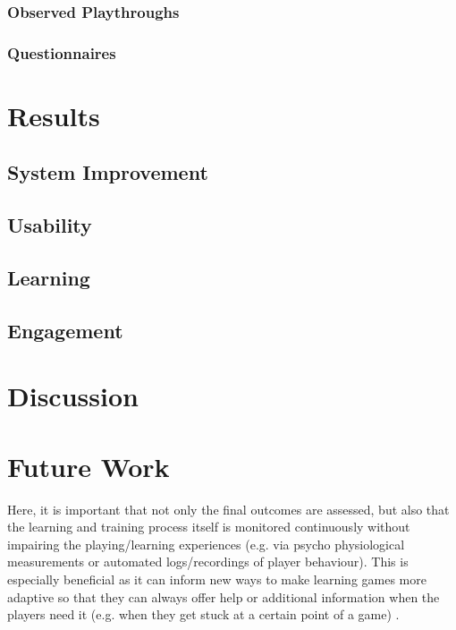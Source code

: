 \documentclass[a4paper,11.5pt]{report}
\numberwithin{figure}{section}
\numberwithin{table}{section}
\numberwithin{equation}{section}
\numberwithin{equation}{section}
\newcommand\blankpage{%
    \null
    \thispagestyle{empty}%
    \addtocounter{page}{-1}%
    \newpage}
\begin{document}
\subsection{Observed Playthroughs} %
\subsection{Questionnaires}



\afterpage{\blankpage}




\chapter{Results}

\section{System Improvement}

\section{Usability}

\section{Learning}

\section{Engagement}

\afterpage{\blankpage}




\chapter{Discussion}
\afterpage{\blankpage}



\chapter{Future Work}

Here, it is important that not only the final outcomes are assessed, but also that the learning and training process itself is monitored continuously without impairing the playing/learning experiences (e.g. via psycho physiological measurements or automated logs/recordings of player behaviour). This is especially beneficial as it can inform new ways to make learning games more adaptive so that they can always offer help or additional information when the players need it (e.g. when they get stuck at a certain point of a game) \citep{Breuer2010}.
\end{document}
